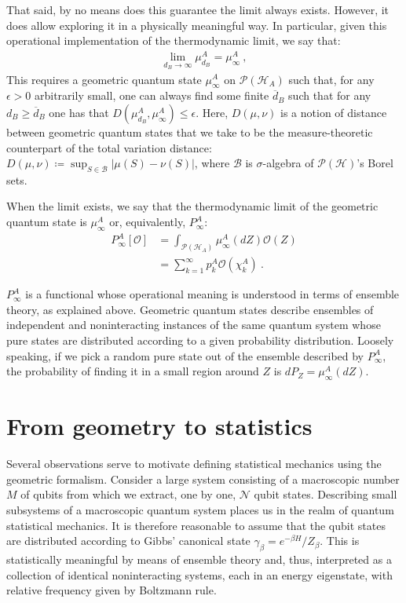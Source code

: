 \documentclass[draft,nofootinbib,pre,twocolumn,showpacs,showkeys,groupaddress,preprintnumbers,floatfix]{revtex4-1}
\newcommand{\1}{\mathbbm{1}}
\begin{document}
That said, by no means does this guarantee the limit always exists. However, it
does allow exploring it in a physically meaningful way. In particular, given
this operational implementation of the thermodynamic limit, we say that:
\begin{align*}
\lim_{d_B \to \infty} \mu_{d_B}^A = \mu^A_{\infty}
  ~,
\end{align*}
This requires a geometric quantum state $\mu_{\infty}^A$ on
$\mathcal{P}(\mathcal{H}_A)$ such that, for any $\epsilon > 0$ arbitrarily
small, one can always find some finite $\overline{d}_B$ such that for any $d_B
\geq \overline{d}_B$ one has that $D(\mu_{d_B}^A,\mu_{\infty}^A) \leq
\epsilon$. Here, $D(\mu,\nu)$ is a notion of distance between geometric quantum
states that we take to be the measure-theoretic counterpart of the total
variation distance: $D(\mu,\nu)\coloneqq \sup_{S \in \mathcal{B}}\left\vert
\mu(S) - \nu(S)\right\vert$, where $\mathcal{B}$ is $\sigma$-algebra of
$\mathcal{P}(\mathcal{H})$'s Borel sets.

When the limit exists, we say that the thermodynamic limit of the geometric
quantum state is $\mu_{\infty}^A$ or, equivalently, $P^A_{\infty}$:
\begin{align*}
P_{\infty}^A\left[ \mathcal{O}\right]
  & = \int_{\mathcal{P}(\mathcal{H}_A)} \!\!\!\!\!\!\!\!\!\!\!\!
  \mu_{\infty}^A(dZ) \mathcal{O}(Z) \\
  & = \sum_{k=1}^{\infty} p_k^A \mathcal{O}(\chi_k^A)
  ~.
\end{align*}

$P^A_{\infty}$ is a functional whose operational meaning is understood in 
terms of ensemble theory, as explained above. Geometric quantum states 
describe ensembles of independent and noninteracting instances of the same 
quantum system whose pure states are distributed according to a given probability 
distribution. Loosely speaking, if we pick a random pure state out of the ensemble 
described by $P^A_{\infty}$, the probability of finding it in a small region around 
$Z$ is $dP_Z = \mu_{\infty}^A( dZ )$. 

\section{From geometry to statistics}
\label{sec:GeoStats}

Several observations serve to motivate defining statistical mechanics
using the geometric formalism. Consider a large system consisting of a
macroscopic number $M$ of qubits from which we extract, one by one,
$\mathcal{N}$ qubit states. Describing small subsystems of a macroscopic 
quantum system places us in the realm of quantum statistical mechanics. 
It is therefore reasonable to assume that the qubit states are distributed
according to Gibbs' canonical state $\gamma_\beta = e^{-\beta H}/Z_\beta$.
This is statistically meaningful by means of ensemble theory and, thus,
interpreted as a collection of identical noninteracting systems, each in an
energy eigenstate, with relative frequency given by Boltzmann rule.  
\end{document}
